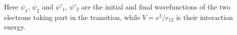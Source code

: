 Here $\psi_1$, $\psi_2$ and $\psi'_1$, $\psi'_2$ are the initial and final wavefunctions of the two electrons taking part in the transition, while $V=e^2/r_{12}$ is their interaction energy.
